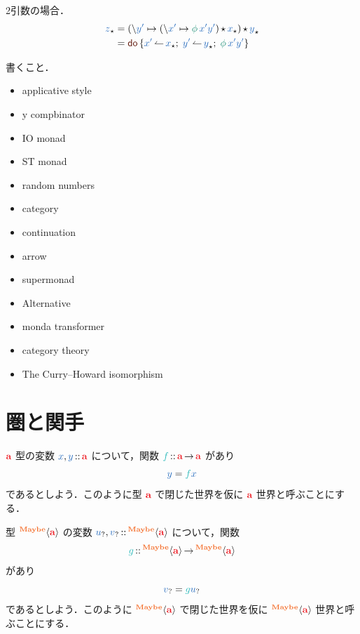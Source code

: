 \documentclass[a5paper,twoside,fleqn,draft]{jsbook}
\begin{document}
2引数の場合．
\begin{align*}
\hAnyContextVar{z}
&=(\hLambdaSyntax{\hVar{y'}}{(\hLambdaSyntax{\hVar{x'}}{\hAction{\phi}\hVar{x'}\hVar{y'}})\hMonadicBind\hAnyContextVar{x}})\hMonadicBind\hAnyContextVar{y}\\
&=\hDoSyntax{\hVar{x'}\hDoArrow\hAnyContextVar{x};\;
\hVar{y'}\hDoArrow\hAnyContextVar{y};\;
\hAction{\phi}\hVar{x'}\hVar{y'}}
\end{align*}

\separator

書くこと．

\begin{itemize}
\item applicative style
\item y compbinator
\item IO monad
\item ST monad
\item random numbers
\item category
\item continuation
\item arrow
\item supermonad
\item Alternative
\item monda transformer
\item category theory
\item The Curry–Howard isomorphism
\end{itemize}


\section{圏と関手}

$\hTypeName{a}$ 型の変数 $\hVar{x},\hVar{y}\hIsTypeOf\hTypeName{a}$ について，関数 $\hFunc{f}\hIsTypeOf\hTypeName{a}\hFunctionArrow\hTypeName{a}$ があり
\begin{equation}
  \hVar{y}
  =\hFunc{f}\hVar{x}
\end{equation}
であるとしよう．このように型 $\hTypeName{a}$ で閉じた世界を仮に $\hTypeName{a}$ 世界と呼ぶことにする．

型 $\hMaybeConstruct{\hTypeName{a}}$ の変数 $\hMaybeVar{u},\hMaybeVar{v}\hIsTypeOf\hMaybeConstruct{\hTypeName{a}}$ について，関数
\begin{equation}
  \hFunc{g}
  \hIsTypeOf\hMaybeConstruct{\hTypeName{a}}\hFunctionArrow\hMaybeConstruct{\hTypeName{a}}
\end{equation}
があり
\begin{equation}
  \hMaybeVar{v}
  =\hFunc{g}\hMaybeVar{u}
\end{equation}
であるとしよう．このように $\hMaybeConstruct{\hTypeName{a}}$ で閉じた世界を仮に $\hMaybeConstruct{\hTypeName{a}}$ 世界と呼ぶことにする．
\end{document}
